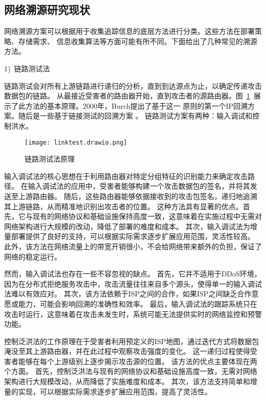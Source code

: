 \subsection{网络溯源研究现状}
网络溯源方案可以根据用于收集追踪信息的底层方法进行分类。这些方法在部署策略、存储需求、
信息收集算法等方面可能有所不同。下面给出了几种常见的溯源方法\cite{singh2016}。\par

1)~链路测试法\par
链路测试会对所有上游链路进行递归的分析，直到到达源点为止，以确定传递攻击数据包的链路。
从最接近受害者的路由器开始，直到攻击者的源路由器。图~\ref{fig:linktest}~展示了此方法的基本原理。2000年，Burch提出了基于这一
原则的第一个IP回溯方案\cite{Burch2000Tracing}。随后是一些基于链接测试的回溯方案
\cite{bhavani2020ip,hasan2023deep,
ThingSlomanDulay2008DDoSDetection}。
链路测试方案有两种：输入调试和控制洪水。
\begin{figure}[htbp]
  \centering
  \texttt{[image: linktest.drawio.png]}
  \caption{链路测试法原理}
  \label{fig:linktest}
\end{figure}

输入调试法的核心思想在于利用路由器对特定分组特征的识别能力来确定攻击路径。
在输入调试法的应用中，受害者能够构建一个攻击数据包的签名，并将其发送至上游路由器。
随后，这些路由器能够依据接收到的攻击包签名，递归地追溯其上游链路，从而精准地识别出攻击者的位置。
这种方法具有显著的优点。首先，它与现有的网络协议和基础设施保持高度一致，这意味着在实施过程中无需对网络架构进行大规模的改动，降低了部署的难度和成本。
其次，输入调试法为增量部署提供了良好的支持，可以根据实际需求逐步扩展应用范围，灵活性较高。
此外，该方法在网络流量上的带宽开销很小，不会给网络带来额外的负担，保证了网络的稳定运行。

然而，输入调试法也存在一些不容忽视的缺点。
首先，它并不适用于DDoS环境，因为在分布式拒绝服务攻击中，攻击流量往往来自多个源头，使得单一的输入调试法难以有效应对。
其次，该方法依赖于ISP之间的合作，如果ISP之间缺乏合作意愿或能力，可能会影响回溯的准确性和效率。
最后，输入调试法的跟踪系统只在攻击时运行，这意味着在攻击未发生时，系统可能无法提供实时的网络监控和预警功能。

控制泛洪法的工作原理在于受害者利用预定义的ISP地图，通过迭代方式将数据包淹没至其上游路由器，并在此过程中观察攻击强度的变化。
这一递归过程使得受害者能够在每个上游级别上逐步揭示攻击源的位置。
该方法的优点主要体现在两个方面。
首先，控制泛洪法与现有的网络协议和基础设施高度一致，无需对网络架构进行大规模改动，从而降低了实施难度和成本。
其次，该方法支持简单和增量的实现，可以根据实际需求逐步扩展应用范围，提高了灵活性。

